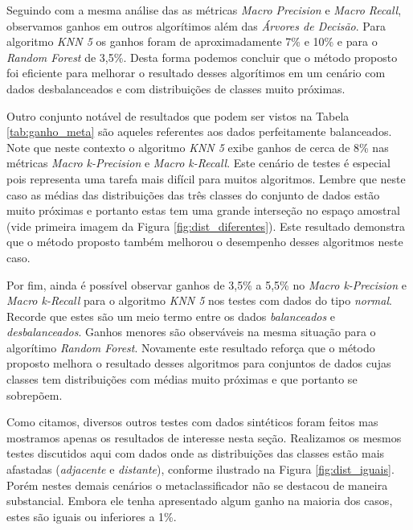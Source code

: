 Seguindo com a mesma análise das as métricas \textit{Macro Precision} e \textit{Macro Recall}, observamos ganhos em outros algorítimos além das \textit{Árvores de Decisão}.
Para algoritmo \textit{KNN 5} os ganhos foram de aproximadamente 7\% e 10\% e para o \textit{Random Forest} de 3,5\%.
Desta forma podemos concluir que o método proposto foi eficiente para melhorar o resultado desses algorítimos em um cenário com dados desbalanceados e com distribuições de classes muito próximas.

Outro conjunto notável de resultados que podem ser vistos na Tabela \ref{tab:ganho_meta} são aqueles referentes aos dados perfeitamente balanceados.
Note que neste contexto o algoritmo \textit{KNN 5} exibe ganhos de cerca de 8\% nas métricas \textit{Macro k-Precision} e \textit{Macro k-Recall}.
Este cenário de testes é especial pois representa uma tarefa mais difícil para muitos algoritmos.
Lembre que neste caso as médias das distribuições das três classes do conjunto de dados estão muito próximas e portanto estas tem uma grande interseção no espaço amostral (vide primeira imagem da Figura \ref{fig:dist_diferentes}).
Este resultado demonstra que o método proposto também melhorou o desempenho desses algoritmos neste caso.

Por fim, ainda é possível observar ganhos de 3,5\% a 5,5\% no \textit{Macro k-Precision} e \textit{Macro k-Recall} para o algoritmo \textit{KNN 5} nos testes com dados do tipo \textit{normal}.
Recorde que estes são um meio termo entre os dados \textit{balanceados} e \textit{desbalanceados}.
Ganhos menores são observáveis na mesma situação para o algorítimo \textit{Random Forest}.
Novamente este resultado reforça que o método proposto melhora o resultado desses algoritmos para conjuntos de dados cujas classes tem distribuições com médias muito próximas e que portanto se sobrepõem.

Como citamos, diversos outros testes com dados sintéticos foram feitos mas mostramos apenas os resultados de interesse nesta seção.
Realizamos os mesmos testes discutidos aqui com dados onde as distribuições das classes estão mais afastadas (\textit{adjacente} e \textit{distante}), conforme ilustrado na Figura \ref{fig:dist_iguais}.
Porém nestes demais cenários o metaclassificador não se destacou de maneira substancial.
Embora ele tenha apresentado algum ganho na maioria dos casos, estes são iguais ou inferiores a 1\%.
